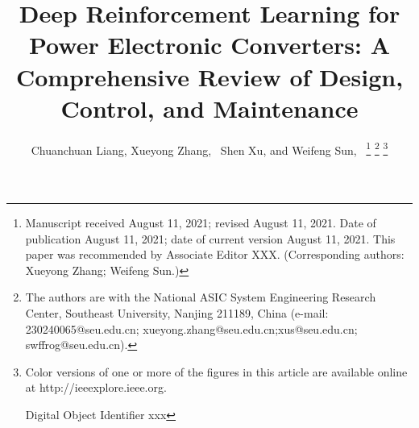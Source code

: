 \title{Deep Reinforcement Learning for Power Electronic Converters: A Comprehensive Review of Design, Control, and Maintenance}


\author{
        Chuanchuan Liang,
        Xueyong Zhang,~
        Shen Xu,
        and Weifeng Sun,~%
\thanks{
Manuscript received August 11, 2021; revised August 11, 2021. Date of publication August 11, 2021; date of current version August 11, 2021. This paper was recommended by Associate Editor XXX.  (Corresponding authors: Xueyong Zhang; Weifeng Sun.)
}%
\thanks{
% 
The authors are with the National ASIC System Engineering Research Center, Southeast University, Nanjing 211189, China 
(e-mail: 230240065@seu.edu.cn; xueyong.zhang@seu.edu.cn;xus@seu.edu.cn; swffrog@seu.edu.cn).
}%
\thanks{
Color versions of one or more of the figures in this article are available online at http://ieeexplore.ieee.org. \par
Digital Object Identifier xxx
}
}

